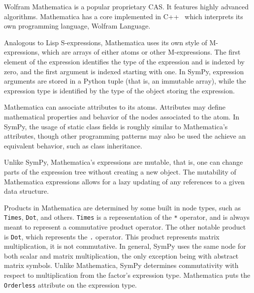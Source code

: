 
Wolfram Mathematica is a popular proprietary CAS\@.
It features highly advanced algorithms.
Mathematica has a core implemented in C++~\cite{Wolfram2016}
which interprets its own programming language, Wolfram Language.


Analogous to Lisp S-expressions,
Mathematica uses its own style of M-expres\-sions,
which are arrays of either atoms or other M-expressions.
The first element of the expression identifies the type of the expression
and is indexed by zero, and the first argument is indexed starting with one.
In SymPy, expression arguments are stored in a Python tuple
(that is, an immutable array),
while the expression type is identified by the type of the object storing the
expression.


Mathematica can associate attributes to its atoms.
Attributes may define mathematical properties and behavior of the nodes
associated to the atom.
In SymPy, the usage of static class fields is roughly similar to Mathematica's
attributes, though other programming patterns may also be used the achieve an
equivalent behavior, such as class inheritance.


Unlike SymPy, Mathematica's expressions are mutable,
that is, one can change parts of the expression tree without
creating a new object.
The mutability of Mathematica expressions allows for a lazy updating of any references
to a given data structure.


Products in Mathematica are determined by some built in node types, such as
\texttt{Times}, \texttt{Dot}, and others.  \texttt{Times} is a representation of
the \texttt{*} operator, and is always meant to represent a commutative product
operator.  The other notable product is \texttt{Dot}, which represents the
\texttt{.} operator.  This product represents matrix multiplication, it is not
commutative.  In general, SymPy uses the same node for both scalar and matrix
multiplication, the only exception being with abstract matrix symbols.  Unlike
Mathematica, SymPy determines commutativity with respect to multiplication from
the factor's expression type.  Mathematica puts the \texttt{Orderless} attribute
on the expression type.

